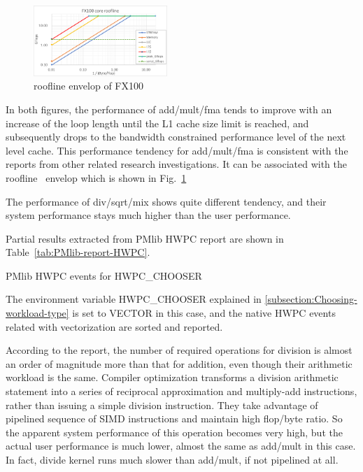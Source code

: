 \documentclass[conference]{IEEEtran}
\begin{document}
\begin{figure}[tb]
\includegraphics[width=0.45\textwidth]{figs/roofline-fx100.pdf}
\caption{roofline envelop of FX100}
\label{fig:roofline-fx100}
\end{figure}

In both figures,
the performance of add/mult/fma tends to improve with an increase of
the loop length until the L1 cache size limit is reached,
and subsequently drops to the bandwidth constrained performance level
of the next level cache.
This performance tendency for add/mult/fma is consistent with the reports
from other related research investigations.
It can be associated with the roofline~\cite{Williams:2009}
envelop which is shown in Fig.~\ref{fig:roofline-fx100}

The performance of div/sqrt/mix shows quite different tendency, and
their system performance stays much higher than the user performance.

Partial results extracted from PMlib HWPC report are shown
in Table~\ref{tab:PMlib-report-HWPC}.
%
\begin{table}[bt]
\centering
\caption{PMlib HWPC events for HWPC\_CHOOSER}
\label{tab:PMlib-report-HWPC}
\footnotesize %

\end{table}
%
The environment variable HWPC\_CHOOSER explained in
\ref{subsection:Choosing-workload-type} is set to VECTOR in this case,
and the native HWPC events related with vectorization are sorted and reported.

According to the report,
the number of required operations for division is almost an order of magnitude
more than that for addition, even though their arithmetic workload
is the same.
Compiler optimization transforms
a division arithmetic statement into a series of reciprocal
approximation and multiply-add instructions, rather than issuing
a simple division instruction. They take advantage of pipelined sequence of
SIMD instructions and maintain high flop/byte ratio.
So the apparent system performance of this operation becomes very high,
but the actual user performance is much lower, almost the same as
add/mult in this case. In fact, divide kernel runs much slower than add/mult,
if not pipelined at all.
\end{document}
